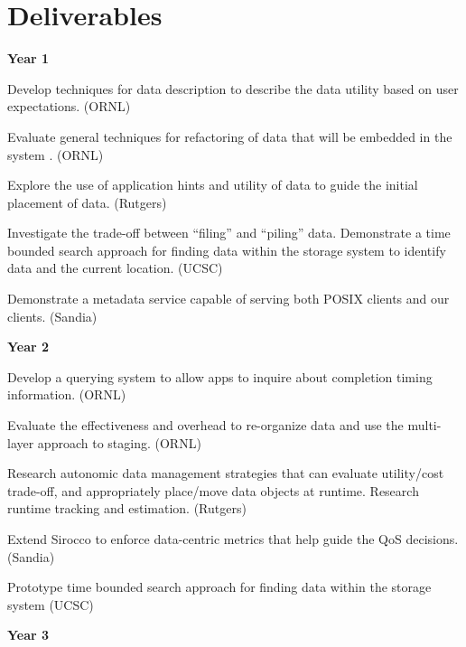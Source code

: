 \section{Deliverables}
\small

\textbf{Year 1}
\begin{tightItemize}
\item Develop  techniques for data description  to 
describe the data utility based on user expectations. (ORNL)

\item Evaluate general  techniques for refactoring of data
that will be embedded in the system . (ORNL)
\item Explore the use of application hints and utility of data to guide the initial placement of data. 
(Rutgers)
\item Investigate the trade-off between ``filing'' and ``piling'' data. 
Demonstrate a time bounded search approach for finding data within the storage system
to identify data and the current location. (UCSC)
\item Demonstrate a metadata service capable of serving both POSIX clients and our clients. (Sandia)
\end{tightItemize}
\textbf{Year 2}
\begin{tightItemize}
\item Develop a querying system to allow apps to inquire
about completion timing information. (ORNL)
\item Evaluate the effectiveness and overhead to re-organize data and use the multi-layer approach 
to staging. (ORNL)
\item Research autonomic data management strategies that
can evaluate utility/cost trade-off, and appropriately place/move data objects at runtime. 
Research runtime tracking and estimation. (Rutgers)
\item Extend Sirocco to enforce data-centric metrics that help guide the QoS decisions. (Sandia)
\item Prototype time bounded search approach for finding data within the storage system (UCSC)
\end{tightItemize}
\textbf{Year 3}

